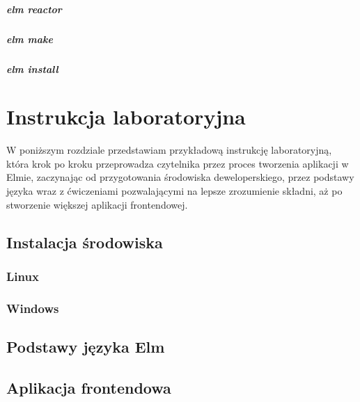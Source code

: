 \documentclass[twoside,a4paper]{report}
\begin{document}
\paragraph{elm reactor}

\paragraph{elm make}

\paragraph{elm install}



\chapter{Instrukcja laboratoryjna}
W poniższym rozdziale przedstawiam przykładową instrukcję laboratoryjną, która krok po kroku przeprowadza czytelnika przez proces tworzenia aplikacji w Elmie, zaczynając od przygotowania środowiska deweloperskiego, przez podstawy języka wraz z ćwiczeniami pozwalającymi na lepsze zrozumienie składni, aż po stworzenie większej aplikacji frontendowej.

\section{Instalacja środowiska}

\subsection{Linux}

\subsection{Windows}

\section{Podstawy języka Elm}

\section{Aplikacja frontendowa}

\end{document}
